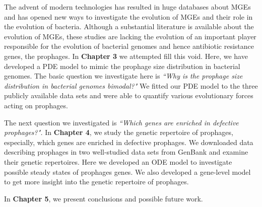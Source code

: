 The advent of modern technologies has resulted in huge databases about MGEs and has opened new ways to investigate the evolution of MGEs and their role in the evolution of bacteria. Although a substantial literature is available about the evolution of MGEs, these studies are lacking the evolution of an important player responsible for the evolution of bacterial genomes and hence antibiotic resistance genes, the prophages. In \textbf{Chapter 3} we attempted fill this void. Here, we have developed a PDE model to mimic the prophage size distribution in bacterial genomes. The basic question we investigate here is \textit{``Why is the prophage size distribution in bacterial genomes bimodal?"} We fitted our PDE model to the three publicly available data sets and were able to quantify various evolutionary forces acting on prophages. 

The next question we investigated is \textit{``Which genes are enriched in defective prophages?".} In \textbf{Chapter 4}, we study the genetic repertoire of prophages, especially, which genes are enriched in defective prophages. We downloaded data describing prophages in two well-studied data sets from GenBank and examine their genetic repertoires. Here we developed an ODE model to investigate possible steady states of prophages genes. We also developed a gene-level model to get more insight into the genetic repertoire of prophages. 

In \textbf{Chapter 5}, we present conclusions and possible future work.  




